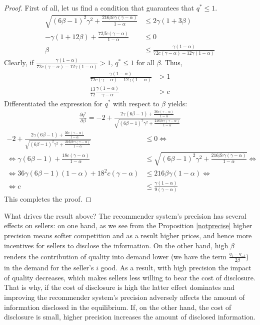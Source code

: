 \documentclass[a4paper]{article}
\begin{document}
\begin{proof}
	First of all, let us find a condition that guarantees that $q^* \le 1$. 
	\begin{align*}
	\sqrt{(6 \beta - 1)^2 \gamma^2 + \frac{216 \beta c \gamma (\gamma - \alpha)}{1-\alpha}} &\le 2\gamma (1+3 \beta)\\
	-\gamma(1+12 \beta) + \frac{72 \beta c (\gamma - \alpha)}{1 - \alpha} &\le 0\\
	\beta &\le \frac{\gamma(1-\alpha)}{72c (\gamma - \alpha) - 12 \gamma (1-\alpha)}
	\end{align*}
	Clearly, if $\frac{\gamma(1-\alpha)}{72c (\gamma - \alpha) - 12 \gamma (1-\alpha)} > 1$, $q^* \le 1$ for all $\beta$. Thus, 
	\begin{align*}
	\frac{\gamma(1-\alpha)}{72c (\gamma - \alpha) - 12 \gamma (1-\alpha)} &> 1\\
	\frac{13}{72} \frac{\gamma(1-\alpha)}{\gamma - \alpha} &> c
	\end{align*}
	Differentiated the expression for $q^*$ with respect to $\beta$ yields:
	\begin{align*}
	\frac{\partial q^*}{\partial \beta} = -2 + \frac{2 \gamma (6 \beta - 1) + \frac{36 c (\gamma - \alpha)}{1-\alpha}}{ \sqrt{(6 \beta - 1)^2\gamma^2 + \frac{216 \beta c \gamma (\gamma - \alpha)}{1-\alpha}}}
	\end{align*} 
	\begin{align*}
	-2 + \frac{2 \gamma (6 \beta - 1) + \frac{36 c (\gamma - \alpha)}{1-\alpha}}{ \sqrt{(6 \beta - 1)^2\gamma^2 + \frac{216 \beta c \gamma (\gamma - \alpha)}{1-\alpha}}} &\le 0 \iff\\
	\iff \gamma(6 \beta - 1) + \frac{18c(\gamma - \alpha)}{1- \alpha} &\le \sqrt{(6 \beta - 1)^2\gamma^2 + \frac{216 \beta c \gamma (\gamma - \alpha)}{1-\alpha}} \iff\\
	\iff 36 \gamma (6 \beta - 1)(1-\alpha) + 18^2 c(\gamma - \alpha) &\le 216 \beta \gamma (1-\alpha) \iff\\
	\iff c &\le \frac{\gamma(1 - \alpha)}{9(\gamma - \alpha)}  
	\end{align*} 
	This completes the proof.
\end{proof}


What drives the result above? The recommender system's precision has several effects on sellers: on one hand, as we see from the Proposition \ref{notprecise} higher precision means softer competition and as a result higher prices, and hence more incentives for sellers to disclose the information. On the other hand, high $\beta$ renders the contribution of quality into demand lower (we have the term $\frac{\tilde{q}_i - \tilde{q}_{-i}}{2 \beta}$) in the demand for the seller's $i$ good. As a result, with high precision the impact of quality decreases, which makes sellers less willing to bear the cost of disclosure. That is why, if the cost of disclosure is high the latter effect dominates and improving the recommender system's precision adversely affects the amount of information disclosed in the equilibrium. If, on the other hand, the cost of disclosure is small, higher precision increases the amount of disclosed information. 
\end{document}

